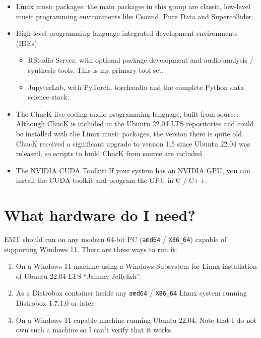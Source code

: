 \documentclass[
  letterpaper,
  DIV=11,
  numbers=noendperiod]{scrreprt}
\providecommand{\tightlist}{%
  \setlength{\itemsep}{0pt}\setlength{\parskip}{0pt}}\usepackage{longtable,booktabs,array}
\begin{document}
\begin{itemize}
\item
  Linux music packages: the main packages in this group are classic,
  low-level music programming environments like Csound, Pure Data and
  Supercollider.
\item
  High-level programming language integrated development environments
  (IDEs):

  \begin{itemize}
  \tightlist
  \item
    RStudio Server, with optional package development and audio analysis
    / synthesis tools. This is my primary tool set.
  \item
    JupyterLab, with PyTorch, torchaudio and the complete Python data
    science stack.
  \end{itemize}
\item
  The ChucK live coding audio programming language, built from source:
  Although ChucK is included in the Ubuntu 22.04 LTS repositories and
  could be installed with the Linux music packages, the version there is
  quite old. ChucK received a significant upgrade to version 1.5 since
  Ubuntu 22.04 was released, so scripts to build ChucK from source are
  included.
\item
  The NVIDIA CUDA Toolkit: If your system has an NVIDIA GPU, you can
  install the CUDA toolkit and program the GPU in C / C++.
\end{itemize}

\section*{What hardware do I need?}\label{what-hardware-do-i-need}


EMT should run on any modern 64-bit PC (\texttt{amd64} /
\texttt{X86\_64}) capable of supporting Windows 11. There are three ways
to run it:

\begin{enumerate}
\def\labelenumi{\arabic{enumi}.}
\tightlist
\item
  On a Windows 11 machine using a Windows Subsystem for Linux
  installation of Ubuntu 22.04 LTS ``Jammy Jellyfish''.
\item
  As a Distrobox container inside any \texttt{amd64} / \texttt{X86\_64}
  Linux system running Distrobox 1.7.1.0 or later.
\item
  On a Windows 11-capable machine running Ubuntu 22.04. Note that I do
  not own such a machine so I can't verify that it works.
\end{enumerate}
\end{document}
